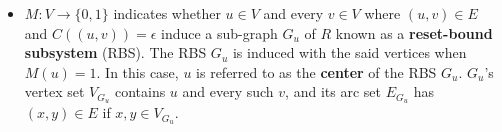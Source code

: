 \documentclass[12pt]{article}
\begin{document}
\begin{definition}
\begin{itemize}
                \item \begin{math}M : V \rightarrow \{0,1\}\end{math} indicates whether \begin{math}u \in V\end{math} and every \begin{math}v \in V\end{math} where \begin{math}(u,v) \in E\end{math} and \begin{math}C((u,v)) = \epsilon\end{math} induce a sub-graph \begin{math}G_{u}\end{math} of \begin{math}R\end{math} known as a \textbf{reset-bound subsystem} (RBS). The RBS \begin{math}G_{u}\end{math} is induced with the said vertices when \begin{math}M(u) = 1\end{math}. In this case, \begin{math}u\end{math} is referred to as the \textbf{center} of the RBS \begin{math}G_{u}\end{math}. \begin{math}G_{u}\end{math}'s vertex set \begin{math}V_{G_{u}}\end{math} contains \begin{math}u\end{math} and every such \begin{math}v\end{math}, and its arc set \begin{math}E_{G_{u}}\end{math} has \begin{math}(x,y) \in E\end{math} if \begin{math}x,y \in V_{G_{u}}\end{math}. \\
                

\end{itemize}
\end{definition}
\end{document}
